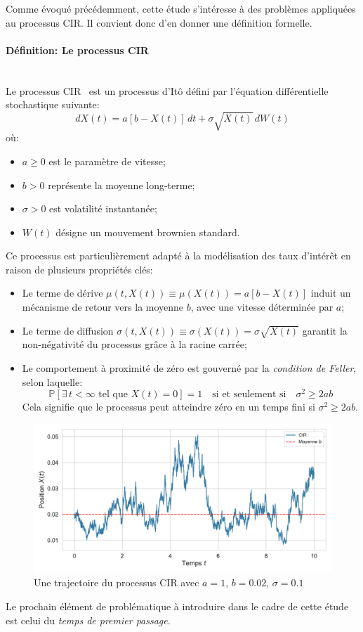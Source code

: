 Comme évoqué précédemment, cette étude s'intéresse à des problèmes appliquées au processus \acl{CIR}. Il convient donc d'en donner une définition formelle.
\paragraph{Définition: Le processus \acl{CIR}}\mbox{}\\
Le processus \ac{CIR}~\cite{cox1985} est un processus d'Itô défini par l'équation différentielle stochastique suivante:
\begin{equation}
    dX(t) = a[b - X(t)]\,dt + \sigma \sqrt{X(t)}\,dW(t)
\end{equation}\label{cir_eq}
où:
\begin{itemize}
    \item $a \geq 0$ est le paramètre de vitesse;
    \item $b > 0$ représente la moyenne long-terme;
    \item $\sigma > 0$ est volatilité instantanée;
    \item $W(t)$ désigne un mouvement brownien standard.
\end{itemize}
Ce processus est particulièrement adapté à la modélisation des taux d'intérêt en raison de plusieurs propriétés clés:
\begin{itemize}
    \item Le terme de dérive $\mu(t, X(t)) \equiv \mu(X(t))= a[b - X(t)]$ induit un mécanisme de retour vers la moyenne $b$, avec une vitesse déterminée par $a$;
    \item Le terme de diffusion $\sigma(t, X(t))\equiv \sigma(X(t)) = \sigma \sqrt{X(t)}$ garantit la non-négativité du processus grâce à la racine carrée;
    \item Le comportement à proximité de zéro est gouverné par la \textit{condition de Feller}, selon laquelle:
    \[
    \mathds{P} \left[ \exists\, t < \infty \text{ tel que } X(t) = 0 \right] = 1 \quad \text{si et seulement si} \quad \sigma^2 \geq 2ab
    \]
    Cela signifie que le processus peut atteindre zéro en un temps fini si $\sigma^2\geq2ab$.
\end{itemize}
\begin{figure}[htb]
    \centering
    \includegraphics[width=0.9\linewidth]{img/intro/path_cir.pdf}
    \caption{Une trajectoire du processus \acs{CIR} avec $a=1$, $b=0.02$, $\sigma=0.1$}\label{fig:TrajCIR}
\end{figure}
\FloatBarrier Le prochain élément de problématique à introduire dans le cadre de cette étude est celui du \textit{temps de premier passage}.
